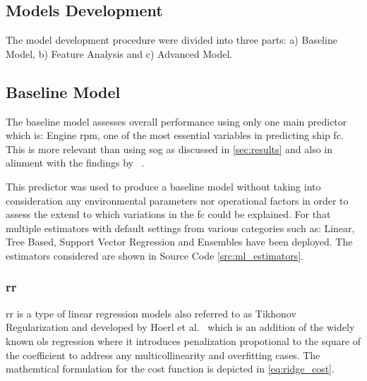 \clearpage

\subsection{Models Development}\label{sec:models_development}

The model development procedure were divided into three parts: a) Baseline Model, b) Feature Analysis and c) Advanced Model. 

\subsection{Baseline Model}\label{sec:baseline_model}

The baseline model assesses overall performance using only one main predictor which is: Engine \ac{rpm}, one of the most essential variables in predicting ship \ac{fc}. 
This is more relevant than using \ac{sog} as discussed in \cref{sec:results} and also in alinment with the findings by ~\citep{Uyanik2022}.

This predictor was used to produce a baseline model without taking into consideration any environmental parameters nor operational factors in order to assess the extend 
to which variations in the \ac{fc} could be explained. For that multiple estimators with default settings from various categories such as: Linear, Tree Based, Support Vector Regression and Ensembles have been deployed. 
The estimators considered are shown in Source Code \ref{src:ml_estimators}.  

\clearpage

\begin{figure}
    
\end{figure}

\subsubsection{\ac{rr}}\label{sec:rr}

\ac{rr} is a type of linear regression models also referred to as Tikhonov Regularization and developed by Hoerl et al.~\citep{hoerl1970ridge}
which is an addition of the widely known \ac{ols} regression where it introduces penalization propotional to the square of the coefficient to address any 
multicollinearity and overfitting cases. The mathemtical formulation for the cost function is depicted in \cref{eq:ridge_cost}.  

